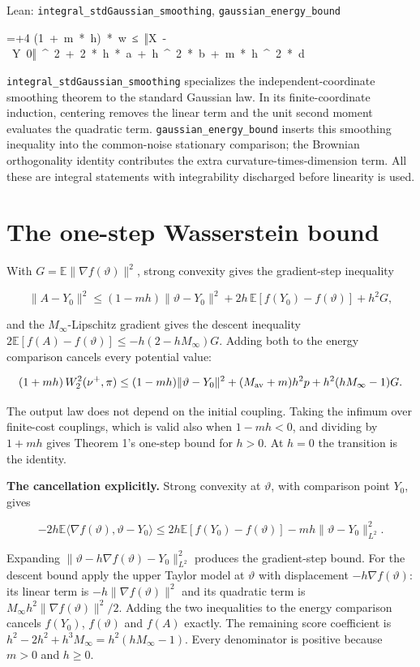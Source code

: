 \documentclass[11pt,a4paper]{article}
\newlength{\leancharwidth}
\newenvironment{leancode}{\par\smallskip\begingroup\ttfamily\footnotesize\raggedright
  \settowidth{\leancharwidth}{M}\setlength{\parskip}{0pt}\setlength{\parindent}{0pt}
  \frenchspacing}{\par\endgroup\smallskip}
\newcommand{\leanline}[2]{\hangindent=\dimexpr#1\leancharwidth+4\leancharwidth\relax
  \hangafter=1\noindent\hspace*{#1\leancharwidth}#2\par}
\newcommand{\leanlabel}[1]{\par\smallskip\noindent{\small\bfseries #1}\par}
\begin{document}
\begin{leanbox}{Lean: \texttt{integral\_\allowbreak{}stdGaussian\_\allowbreak{}smoothing}, \texttt{gaussian\_\allowbreak{}energy\_\allowbreak{}bound}}
\begin{leancode}
\leanline{4}{(1\ +\ m\ *\ h)\ *\ w\ ≤\ ‖X\ -\ Y\ 0‖\ \textasciicircum{}\ 2\ +\ 2\ *\ h\ *\ a\ +\ h\ \textasciicircum{}\ 2\ *\ b\ +\ m\ *\ h\ \textasciicircum{}\ 2\ *\ d}
\end{leancode}
\leanlabel{How the Lean proof follows the argument}
\texttt{integral\_\allowbreak{}std\allowbreak{}Gaussian\_\allowbreak{}smoothing} specializes the independent-coordinate smoothing theorem to the standard Gaussian law. In its finite-coordinate induction, centering removes the linear term and the unit second moment evaluates the quadratic term. \texttt{gaussian\_\allowbreak{}energy\_\allowbreak{}bound} inserts this smoothing inequality into the common-noise stationary comparison; the Brownian orthogonality identity contributes the extra curvature-times-dimension term. All these are integral statements with integrability discharged before linearity is used.
\end{leanbox}

\section{\texorpdfstring{The one-step Wasserstein bound}{The one-step Wasserstein bound}}


With
\(G=\mathbb E\|\nabla f(\vartheta)\|^2\), strong convexity gives the
gradient-step inequality


\[\|A-Y_0\|^2\le(1-mh)\|\vartheta-Y_0\|^2+2h\,\mathbb E[f(Y_0)-f(\vartheta)]+h^2G,\]


and the \(M_\infty\)-Lipschitz gradient gives the descent inequality
\(2\mathbb E[f(A)-f(\vartheta)]\le-h(2-hM_\infty)G\). Adding both to the energy
comparison cancels every potential value:


\[(1+mh)\,W_2^2(\nu^+,\pi)\le(1-mh)\|\vartheta-Y_0\|^2+(M_{\rm av}+m)h^2p
+h^2(hM_\infty-1)G.\]


The output law does not depend on the initial coupling. Taking the
infimum over finite-cost couplings, which is valid also when \(1-mh<0\),
and dividing by \(1+mh\) gives Theorem 1's one-step bound for \(h>0\). At
\(h=0\) the transition is the identity.




\textbf{The cancellation explicitly.} Strong convexity at \(\vartheta\), with comparison point \(Y_0\), gives

\[-2h\mathbb E\langle\nabla f(\vartheta),\vartheta-Y_0\rangle\le2h\mathbb E[f(Y_0)-f(\vartheta)]-mh\|\vartheta-Y_0\|_{L^2}^2.\]

Expanding \(\|\vartheta-h\nabla f(\vartheta)-Y_0\|_{L^2}^2\) produces the gradient-step bound. For the descent bound apply the upper Taylor model at \(\vartheta\) with displacement \(-h\nabla f(\vartheta)\): its linear term is \(-h\|\nabla f(\vartheta)\|^2\) and its quadratic term is \(M_\infty h^2\|\nabla f(\vartheta)\|^2/2\). Adding the two inequalities to the energy comparison cancels \(f(Y_0)\), \(f(\vartheta)\) and \(f(A)\) exactly. The remaining score coefficient is \(h^2-2h^2+h^3M_\infty=h^2(hM_\infty-1)\). Every denominator is positive because \(m>0\) and \(h\ge0\).
\end{document}
